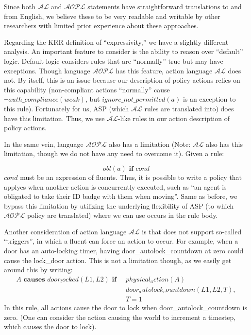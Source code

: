 Since both $\mathcal{AL}$ and $\mathcal{AOPL}$ statements have straightforward translations to and from English, we believe these to be very readable and writable by other researchers with limited prior experience about these approaches.

Regarding the KRR definition of ``expressivity,'' we have a slightly different analysis.
An important feature to consider is the ability to reason over ``default'' logic.
Default logic considers rules that are ``normally'' true but may have exceptions.
Though language $\mathcal{AOPL}$ has this feature, action language $\mathcal{AL}$ does not.
By itself, this is an issue because our description of policy actions relies on this capability (non-compliant actions ``normally'' cause $\neg auth\_compliance(weak)$, but $ignore\_not\_permitted(a)$ is an exception to this rule).
Fortunately for us, ASP (which $\mathcal{AL}$ rules are translated into) does have this limitation.
Thus, we use $\mathcal{AL}$-like rules in our action description of policy actions.

In the same vein, language $\mathcal{AOPL}$ also has a limitation (Note: $\mathcal{AL}$ also has this limitation, though we do not have any need to overcome it).
Given a rule:

\begin{equation}
    obl(a) \textbf{ if } cond
\end{equation}
$cond$ must be an expression of fluents.
Thus, it is possible to write a policy that applyes when another action is concurrently executed, such as ``an agent is obligated to take their ID badge with them when moving''.
Same as before, we bypass this limitation by utilizing the underlying flexibility of ASP (to which $\mathcal{AOPL}$ policy are translated) where we can use occurs in the rule body.

Another consideration of action language $\mathcal{AL}$ is that does not support so-called ``triggers'', in which a fluent can force an action to occur.
For example, when a door has an auto-locking timer, having door\_autolock\_countdown at zero could cause the lock\_door action.
This is not a limitation though, as we easily get around this by writing:
\begin{equation}
\begin{split}
    A \textbf{ causes } door_locked(L1, L2) \textbf{ if } \
        & physical_action(A) \\
        & door_autolock_countdown(L1, L2, T), \\
        & T = 1
\end{split}
\end{equation}
In this rule, all actions cause the door to lock when door\_autolock\_countdown is zero.
(One can consider the action causing the world to increment a timestep, which causes the door to lock).

